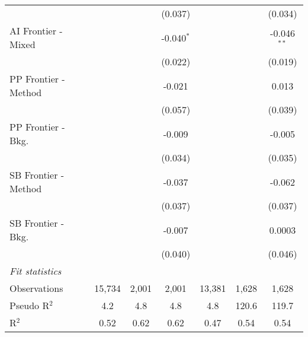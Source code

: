 \begin{tabular}{lcccccc}
                        &              &              & (0.037)      &              &               & (0.034)\\   
   AI Frontier - Mixed  &              &              & -0.040$^{*}$ &              &               & -0.046$^{**}$\\   
                        &              &              & (0.022)      &              &               & (0.019)\\   
   PP Frontier - Method &              &              & -0.021       &              &               & 0.013\\   
                        &              &              & (0.057)      &              &               & (0.039)\\   
   PP Frontier - Bkg.   &              &              & -0.009       &              &               & -0.005\\   
                        &              &              & (0.034)      &              &               & (0.035)\\   
   SB Frontier - Method &              &              & -0.037       &              &               & -0.062\\   
                        &              &              & (0.037)      &              &               & (0.037)\\   
   SB Frontier - Bkg.   &              &              & -0.007       &              &               & 0.0003\\   
                        &              &              & (0.040)      &              &               & (0.046)\\   
   \midrule
   \emph{Fit statistics}\\
   Observations         & 15,734       & 2,001        & 2,001        & 13,381       & 1,628         & 1,628\\  
   Pseudo R$^2$         & 4.2          & 4.8          & 4.8          & 4.8          & 120.6         & 119.7\\  
   R$^2$                & 0.52         & 0.62         & 0.62         & 0.47         & 0.54          & 0.54\\  
   

\end{tabular}
